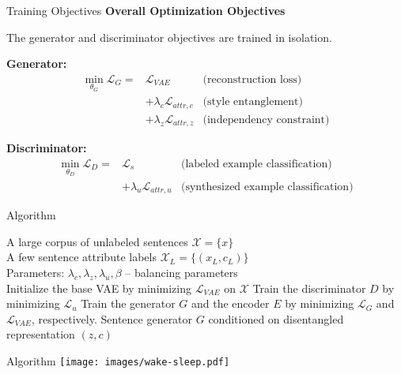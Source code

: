 \documentclass{beamer}
\begin{document}
\begin{frame}{Training Objectives}
  \textbf{Overall Optimization Objectives}

  The generator and discriminator objectives are trained in isolation.

  \textbf{Generator:}
  \begin{eqnarray*}
    \operatorname*{min}_{\theta_G} \mathcal{L}_G =
      & \mathcal{L}_{VAE} & \text{(reconstruction loss)} \\
      & + \lambda_c \mathcal{L}_{attr,c} & \text{(style entanglement)} \\
      & + \lambda_z \mathcal{L}_{attr,z} & \text{(independency constraint)}
  \end{eqnarray*}

  \textbf{Discriminator:}
  \begin{eqnarray*}
    \operatorname*{min}_{\theta_D} \mathcal{L}_D =
      & \mathcal{L}_{s} & \text{(labeled example classification)} \\
      & + \lambda_u \mathcal{L}_{attr,u} & \text{(synthesized example classification)}
  \end{eqnarray*}
\end{frame}

\begin{frame}{Algorithm}
\begin{algorithm}[H]
  \centering
  \begin{algorithmic}[1]
  \REQUIRE A large corpus of unlabeled sentences $\mathcal{X}=\{x\}$ \\
  \quad A few sentence attribute labels $\mathcal{X}_L = \{(x_L,c_L)\}$ \\
  \quad Parameters: $\lambda_c, \lambda_z, \lambda_u, \beta$  -- balancing parameters \\
  \STATE Initialize the base VAE by minimizing $\mathcal{L}_{VAE}$ on $\mathcal{X}$
  \REPEAT
      \STATE Train the discriminator $D$ by minimizing $\mathcal{L}_u$
      \STATE Train the generator $G$ and the encoder $E$ by minimizing $\mathcal{L}_G$ and $\mathcal{L}_{VAE}$, respectively.
  \ENSURE Sentence generator $G$ conditioned on disentangled representation $(z,c)$
  \end{algorithmic}
  \end{algorithm}
\end{frame}

\begin{frame}{Algorithm}
  \centering
  \texttt{[image: images/wake-sleep.pdf]}
\end{frame}
\end{document}
